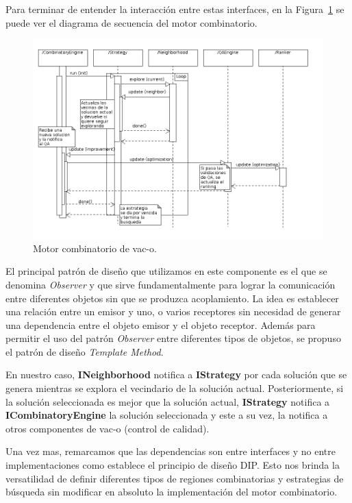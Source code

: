 Para terminar de entender la interacci\'on entre estas interfaces, en la
Figura~\ref{motor} se puede ver el diagrama de secuencia del motor combinatorio.

\begin{figure} 
  \centering
  \includegraphics[scale=0.45]{sequence.png}
  \caption{Motor combinatorio de vac-o.}
\label{motor}
\end{figure}

El principal patr\'on de dise\~no que utilizamos en este componente es el que
se denomina \textit{Observer} y que sirve fundamentalmente para lograr la
comunicaci\'on entre diferentes objetos sin que se produzca acoplamiento. La
idea es establecer una relaci\'on entre un emisor y uno, o varios receptores
sin necesidad de generar una dependencia entre el objeto emisor y el objeto
receptor. Adem\'as para permitir el uso del patr\'on \textit{Observer} entre
diferentes tipos de objetos, se propuso el patr\'on de dise\~no \textit{Template
Method}.

En nuestro caso, \textbf{INeighborhood} notifica a \textbf{IStrategy} por cada
soluci\'on que se genera mientras se explora el vecindario de la soluci\'on
actual. Posteriormente, si la soluci\'on seleccionada es mejor que la soluci\'on
actual, \textbf{IStrategy} notifica a \textbf{ICombinatoryEngine} la soluci\'on
seleccionada y este a su vez, la notifica a otros componentes de \ac{vac-o}
(control de calidad).

Una vez mas, remarcamos que las dependencias son entre interfaces y no entre
implementaciones como establece el principio de dise\~no \ac{DIP}. Esto nos
brinda la versatilidad de definir diferentes tipos de regiones combinatorias y
estrategias de b\'usqueda sin modificar en absoluto la implementaci\'on del
motor combinatorio.